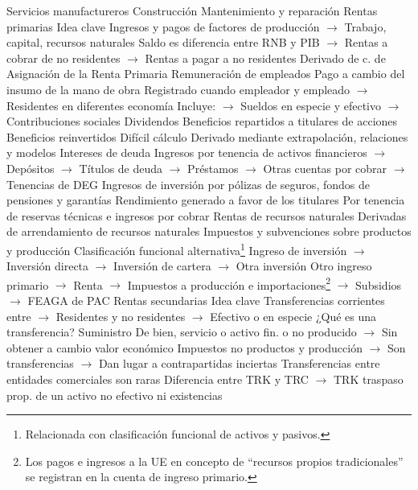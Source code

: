 \documentclass{nuevotema}
\begin{document}
\begin{esquemal}
			\3 Servicios manufactureros
			\3 Construcción
			\3 Mantenimiento y reparación
		\2 Rentas primarias
			\3 Idea clave
				\4[] Ingresos y pagos de factores de producción
				\4[] $\to$ Trabajo, capital, recursos naturales
				\4[] Saldo es diferencia entre RNB y PIB
				\4[] $\to$ Rentas a cobrar de no residentes
				\4[] $\to$ Rentas a pagar a no residentes
				\4[] Derivado de c. de Asignación de la Renta Primaria
			\3 Remuneración de empleados
				\4[] Pago a cambio del insumo de la mano de obra
				\4[] Registrado cuando empleador y empleado
				\4[] $\to$ Residentes en diferentes economía
				\4[] Incluye:
				\4[] $\to$ Sueldos en especie y efectivo
				\4[] $\to$ Contribuciones sociales
			\3 Dividendos
				\4[] Beneficios repartidos a titulares de acciones
			\3 Beneficios reinvertidos
				\4[] Difícil cálculo
				\4[] Derivado mediante extrapolación, relaciones y modelos
			\3 Intereses de deuda
				\4[] Ingresos por tenencia de activos financieros
				\4[] $\to$ Depósitos
				\4[] $\to$ Títulos de deuda
				\4[] $\to$ Préstamos
				\4[] $\to$ Otras cuentas por cobrar
				\4[] $\to$ Tenencias de DEG
			\3 Ingresos de inversión por pólizas de seguros, fondos de pensiones y garantías
				\4[] Rendimiento generado a favor de los titulares
				\4[] Por tenencia de reservas técnicas e ingresos por cobrar
			\3 Rentas de recursos naturales
				\4[] Derivadas de arrendamiento de recursos naturales
			\3 Impuestos y subvenciones sobre productos y producción
				\4 Clasificación funcional alternativa\footnote{Relacionada con clasificación funcional de activos y pasivos.}
				\4[] Ingreso de inversión
				\4[] $\to$ Inversión directa
				\4[] $\to$ Inversión de cartera
				\4[] $\to$ Otra inversión
				\4[] Otro ingreso primario
				\4[] $\to$ Renta
				\4[] $\to$ Impuestos a producción e importaciones\footnote{Los pagos e ingresos a la UE en concepto de ``recursos propios tradicionales'' se registran en la cuenta de ingreso primario.}
				\4[] $\to$ Subsidios
				\4[] $\to$ FEAGA de PAC
		\2 Rentas secundarias
			\3 Idea clave
				\4[] Transferencias corrientes entre
				\4[] $\to$ Residentes y no residentes
				\4[] $\to$ Efectivo o en especie
				\4[] ¿Qué es una transferencia?
				\4[] Suministro De bien, servicio o activo fin. o no producido
				\4[] $\to$ Sin obtener a cambio valor económico
				\4[] Impuestos no productos y producción
				\4[] $\to$ Son transferencias
				\4[] $\to$ Dan lugar a contrapartidas inciertas
				\4[] Transferencias entre entidades comerciales son raras
				\4[] Diferencia entre TRK y TRC
				\4[] $\to$ TRK traspaso prop. de un activo no efectivo ni existencias

\end{esquemal}
\end{document}
